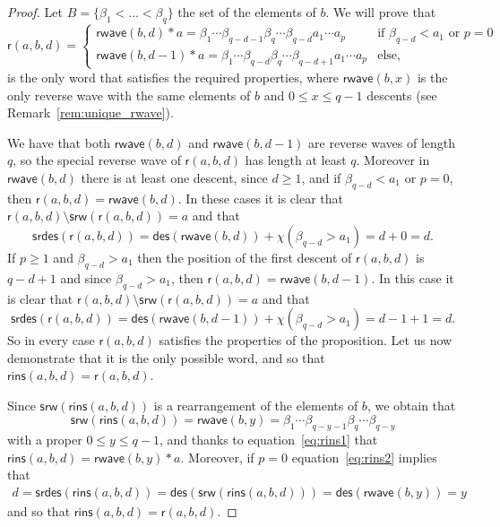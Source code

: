 \documentclass[a4paper]{amsart}
\newcommand{\des}{\mathsf{des}}
\newcommand{\srw}{\mathsf{srw}}
\newcommand{\rins}{\mathsf{rins}}
\newcommand{\rwave}{\mathsf{rwave}}
\newcommand{\srdes}{\mathsf{srdes}}
\theoremstyle{definition}
\theoremstyle{remark}
\numberwithin{equation}{section}
\begin{document}
\begin{proof}
    Let $B=\{\beta_1<\dots<\beta_q\}$ the set of the elements of $b$. 
We will prove that
\begin{equation}
    \mathsf{r}(a,b,d)=\begin{cases}
    \rwave(b,d)*a=\beta_1\cdots\beta_{q-d-1}\beta_q\cdots\beta_{q-d}a_1\cdots a_p & \text{if } \beta_{q-d} <a_1 \text{ or } p=0 \\
    \rwave(b,d-1)*a=\beta_1\cdots\beta_{q-d}\beta_q\cdots\beta_{q-d+1}a_1\cdots a_p & \text{else},
\end{cases}
\end{equation}
is the only word that satisfies the required properties, where $\rwave(b,x)$ is the only reverse wave with the same elements of $b$ and $0\leq x\leq q-1$ descents (see Remark~\ref{rem:unique_rwave}).

We have that both $\rwave(b,d)$ and $\rwave(b,d-1)$ are reverse waves of length $q$, so the special reverse wave of $\mathsf{r}(a,b,d)$ has length at least $q$. Moreover in $\rwave(b,d)$ there is at least one descent, since $d\geq1$, and if $\beta_{q-d}<a_1$ or $p=0$, then $\mathsf{r}(a,b,d)=\rwave(b,d)$. In these cases it is clear that $\mathsf{r}(a,b,d)\setminus\srw(\mathsf{r}(a,b,d))=a$ and that
\begin{equation*}
    \srdes(\mathsf{r}(a,b,d))=\des(\rwave(b,d))+\chi(\beta_{q-d}>a_1)=d+0=d.
\end{equation*}
If $p\geq1$ and $\beta_{q-d}>a_1$ then the position of the first descent of $\mathsf{r}(a,b,d)$ is $q-d+1$ and since $\beta_{q-d}>a_1$, then $\mathsf{r}(a,b,d)=\rwave(b,d-1)$.
In this case it is clear that $\mathsf{r}(a,b,d)\setminus\srw(\mathsf{r}(a,b,d))=a$ and that
\begin{equation*}
    \srdes(\mathsf{r}(a,b,d))=\des(\rwave(b,d-1))+\chi(\beta_{q-d}>a_1)=d-1+1=d.
\end{equation*}
So in every case $\mathsf{r}(a,b,d)$ satisfies the properties of the proposition. Let us now demonstrate that it is the only possible word, and so that $\rins(a,b,d)=\mathsf{r}(a,b,d)$.

Since $\srw(\rins(a,b,d))$ is a rearrangement of the elements of $b$, we obtain that 
\begin{equation*}
\srw(\rins(a,b,d))=\rwave(b,y)=\beta_1\cdots\beta_{q-y-1}\beta_q\cdots\beta_{q-y}    
\end{equation*} with a proper $0\leq y\leq q-1$, and thanks to equation~\eqref{eq:rins1} that $\rins(a,b,d)=\rwave(b,y)*a$. 
Moreover, if $p=0$ equation~\eqref{eq:rins2} implies that
\begin{align*}
    d=\srdes(\rins(a,b,d))=\des(\srw(\rins(a,b,d)))=\des(\rwave(b,y))=y
\end{align*}
and so that $\rins(a,b,d)=\mathsf{r}(a,b,d)$.


\end{proof}
\end{document}
